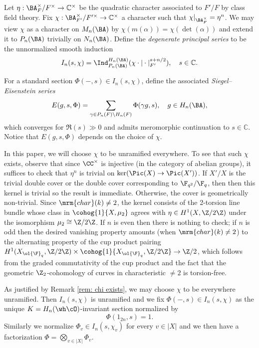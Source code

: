 Let $\eta: \BA_{F}^\times/F^\times\rightarrow \mathbb{C}^\times$ be the quadratic character associated to $F'/F$ by class field theory. Fix $\chi: \BA_{F'}^\times/F'^\times\rightarrow \mathbb{C}^\times$ a character such that $\chi|_{\BA_F^\times}=\eta^n$. We may view $\chi$ as a character on $M_n(\BA)$ by $\chi(m(\alpha))=\chi(\det(\alpha))$ and extend it to $P_n(\BA)$ trivially on $N_n(\BA)$. Define the \emph{degenerate principal series} to be the unnormalized smooth induction
$$
I_n(s,\chi)=\Ind_{P_n(\BA)}^{H_n(\BA)}(\chi\cdot |\cdot|_{F'}^{s+n/2}),\quad s\in \mathbb{C}.
$$

For a standard section $\Phi(-, s)\in I_n(s,\chi)$, define the associated \emph{Siegel--Eisenstein series}
$$E(g,s, \Phi)= \sum_{\gamma\in P_n(F)\backslash H_n(F)}\Phi(\gamma g, s),\quad g\in H_n(\BA),
$$ which converges for $\Re(s)\gg 0$ and admits meromorphic continuation to $s\in \mathbb{C}$. Notice that $E(g,s,\Phi)$ depends on the choice of $\chi$.


\begin{remark}
\notready\label{rem: chi exists}
In this paper, we will choose $\chi$ to be unramified everywhere. To see that such $\chi$ exists, observe that since $\CC^{\times}$ is injective (in the category of abelian groups), it suffices to check that $\eta^n$ is trivial on $\ker (\Pic(X) \rightarrow \Pic(X') )$. If $X'/X$ is the trivial double cover or the double cover corresponding to $\F_{q^2}/\F_q$, then then this kernel is trivial so the result is immediate. Otherwise, the cover is geometrically non-trivial. Since $\mrm{char}(k) \neq 2$, the kernel consists of the 2-torsion line bundle whose class in $\cohog{1}{X, \mu_2}$ agrees with $\eta \in H^1(X, \Z/2\Z)$ under the isomorphism $\mu_2 \cong \Z/2\Z$. If $n$ is even then there is nothing to check; if $n$ is odd then the desired vanishing property amounts (when $\mrm{char}(k) \neq 2$) to the alternating property of the cup product pairing $H^1(X_{\ol{\F}_q},\Z/2\Z)\times \cohog{1}{X_{\ol{\F}_q},\Z/2\Z}\to \Z/2$, which follows from the graded commutativity of the cup product and the fact that the geometric $\Z_2$-cohomology of curves in characteristic $\neq 2$ is torsion-free.
\end{remark}


As justified by Remark \ref{rem: chi exists}, we may choose $\chi$ to be everywhere unramified. Then  $I_n(s,\chi)$ is unramified and we fix $\Phi(-, s)\in I_n(s,\chi)$  as the unique $K=H_n(\wh\cO)$-invariant section normalized by
$$
\Phi(1_{2n}, s)=1.
$$
Similarly we normalize $\Phi_v \in I_n(s,\chi_v)$ for every $v\in|X|$ and we then have a factorization $\Phi=\bigotimes_{v\in|X|}\Phi_v$.


